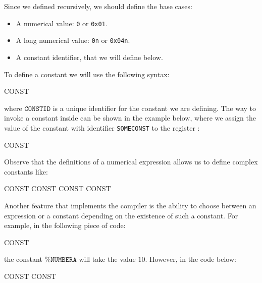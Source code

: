 Since we defined \nexpr recursively, we should define the base cases:

\begin{itemize}

\item A numerical value: \texttt{0} or \texttt{0x01}.

\item A long numerical value: \texttt{0n} or \texttt{0x04n}.

\item A constant identifier, that we will define below.

\end{itemize}

To define a constant we will use the following syntax:

\begin{zkasm}
CONST %
\end{zkasm}

where $\mathtt{CONSTID}$ is a unique identifier for the constant we are defining. The way to invoke a constant inside can be shown in the example below, where we assign the value of the constant with identifier \texttt{SOMECONST} to the register \A:

\begin{zkasm}
CONST %
\end{zkasm}

Observe that the definitions of a numerical expression allows us to define complex constants like:

\begin{zkasm}
CONST %
CONST %
CONST %
CONST %
\end{zkasm}

Another feature that implements the compiler is the ability to choose between an expression or a constant depending on the existence of such a constant. For example, in the following piece of code:

\begin{zkasm}
CONST %
\end{zkasm}

the constant $\texttt{\%}\mathtt{NUMBERA}$ will take the value $10$. However, in the code below:

\begin{zkasm}
CONST %
CONST %
\end{zkasm}

